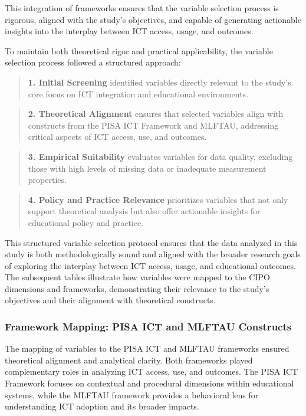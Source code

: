 \documentclass[
]{article}
\begin{document}
This integration of frameworks ensures that the variable selection
process is rigorous, aligned with the study's objectives, and capable of
generating actionable insights into the interplay between ICT access,
usage, and outcomes.

To maintain both theoretical rigor and practical applicability, the
variable selection process followed a structured approach:

\begin{quote}
\textbf{1. Initial Screening} identified variables directly relevant to
the study's core focus on ICT integration and educational environments.
\end{quote}

\begin{quote}
\textbf{2. Theoretical Alignment} ensures that selected variables align
with constructs from the PISA ICT Framework and MLFTAU, addressing
critical aspects of ICT access, use, and outcomes.
\end{quote}

\begin{quote}
\textbf{3. Empirical Suitability} evaluates variables for data quality,
excluding those with high levels of missing data or inadequate
measurement properties.
\end{quote}

\begin{quote}
\textbf{4. Policy and Practice Relevance} prioritizes variables that not
only support theoretical analysis but also offer actionable insights for
educational policy and practice.
\end{quote}

This structured variable selection protocol ensures that the data
analyzed in this study is both methodologically sound and aligned with
the broader research goals of exploring the interplay between ICT
access, usage, and educational outcomes. The subsequent tables
illustrate how variables were mapped to the CIPO dimensions and
frameworks, demonstrating their relevance to the study's objectives and
their alignment with theoretical constructs.

\hypertarget{framework-mapping-pisa-ict-and-mlftau-constructs}{%
\subsubsection{Framework Mapping: PISA ICT and MLFTAU
Constructs}\label{framework-mapping-pisa-ict-and-mlftau-constructs}}

The mapping of variables to the PISA ICT and MLFTAU frameworks ensured
theoretical alignment and analytical clarity. Both frameworks played
complementary roles in analyzing ICT access, use, and outcomes. The PISA
ICT Framework focuses on contextual and procedural dimensions within
educational systems, while the MLFTAU framework provides a behavioral
lens for understanding ICT adoption and its broader impacts.
\end{document}
